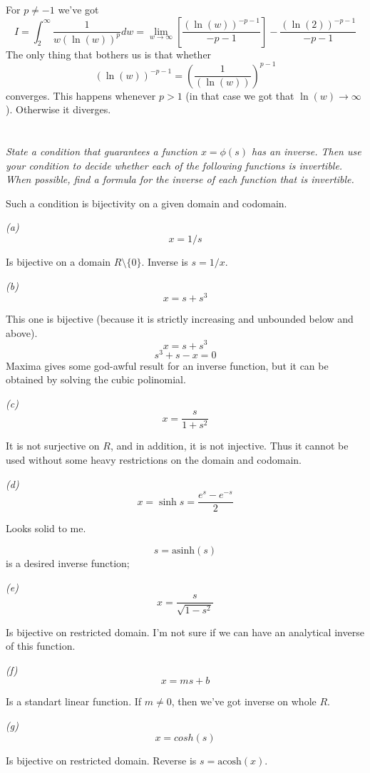 \documentclass[11pt,oneside,titlepage]{book}
\begin{document}
For $p \neq -1$ we've got
$$I = \int_2^\infty{\frac{1}{w (\ln(w))^p} dw} =
\lim_{w \to \infty}{\left[\frac{(\ln(w))^{-p - 1}}{-p - 1}\right]} - \frac{(\ln(2))^{-p - 1}}{-p - 1}
$$
The only thing that bothers us is that whether
$$(\ln(w))^{-p - 1} = (\frac{1}{(\ln(w))})^{p - 1}$$
converges. This happens whenever $p > 1$ (in that case we got that $\ln(w) \to \infty$).
Otherwise it diverges.

\section{}

\textit{State a condition that guarantees a function $x = \phi(s)$ has an inverse. Then use
  your condition to decide whether each of the following functions is invertible. When possible,
  find a formula for the inverse of each function that is invertible.}

Such a condition is bijectivity on a given domain and codomain.

\textit{(a)}
$$x = 1/s$$

Is bijective on a domain $R \setminus \{0\}$. Inverse is $s = 1/x$.

\textit{(b)}
$$x = s + s^3$$

This one is bijective (because it is strictly increasing and unbounded below and above).
$$x = s + s^3$$
$$s^3 + s - x = 0$$
Maxima gives some god-awful result for an inverse function, but it can be obtained by solving the
cubic polinomial.

\textit{(c)}
$$x = \frac{s}{1 + s^2}$$

It is not surjective on $R$, and in addition, it is not injective. Thus it cannot be used
without some heavy restrictions on the domain and codomain.

\textit{(d)}
$$x = \sinh s = \frac{e^s - e^{-s}}{2}$$

Looks solid to me.

$$s = \text{asinh}(s)$$
is a desired inverse function;

\textit{(e)}
$$x = \frac{s}{\sqrt{1 - s^2}}$$

Is bijective on restricted domain. I'm not sure if we can have an analytical inverse of this
function.

\textit{(f)}
$$x = ms + b$$

Is a standart linear function. If $m \neq 0$, then we've got inverse on whole $R$.

\textit{(g)}
$$x = cosh(s)$$

Is bijective on restricted domain. Reverse is $s = \text{acosh}(x)$.
\end{document}
